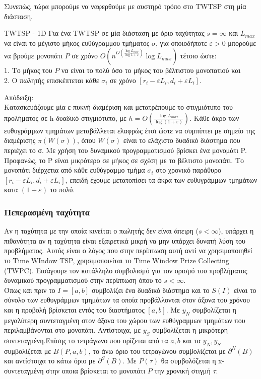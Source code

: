 \documentclass[oneside,12pt]{book}
\theoremstyle{definition}
\begin{document}
Συνεπώς, τώρα μπορούμε να ναφερθούμε με αυστηρό τρόπο στο TWTSP στη μία διάσταση. \\

\begin{mytheorem}{TWTSP - 1D}{}
	Για ένα TWTSP σε μία διάσταση με όριο ταχύτητας \(s = \infty\) και \(L_{max}\) να είναι το μέγιστο μήκος ευθύγραμμου τμήματος \(σ\), για οποιοδήποτε \(ε > 0\) μπορούμε να βρούμε μονοπάτι \(P\) σε χρόνο \(Ο(n^{O(\frac{\log L_{max}}{\log 1 + ε})} \log L_{max})\) τέτοιο ώστε: \\
	1. Το μήκος του \(P\) να είναι το πολύ όσο το μήκος του βέλτιστου μονοπατιού και \\
	2. Ο πωλητής επισκέπτεται κάθε \(σ_i\) σε χρόνο \([r_i - εL_i, d_i + εL_i]\).
\end{mytheorem}

Απόδειξη: \\
Κατασκευάζουμε μία ε-πυκνή διαμέριση και μετατρέπουμε το στιγμιότυπο του προλήματος σε h-δυαδικό στιγμιότυπο, με \(h = O(\frac{\log L_{max}}{\log (1+ε)})\). Κάθε άκρο των ευθυγράμμων τμημάτων μεταβάλλεται ελαφρώς έτσι ώστε να συμπίπτει με σημείο της διαμέρισης \(π(W(σ))\), όπου \(W(σ)\) είναι το ελάχιστο δυαδικό διάστημα που περιέχει το σ. Με χρήση του δυναμικού προγραμματισμού βρίσκει ένα μονομάτι P. Προφανώς, το P είναι μικρότερο σε μήκος σε σχέση με το βέλτιστο μονοπάτι. Το μονοπάτι διέρχετια από κάθε ευθύγραμμο τμήμα \(σ_i\) στο χρονικό παράθυρο \([r_i - εL_i, d_i + εL_i]\), επειδή έχουμε μετατοπίσει τα άκρα των ευθυγράμμων τμημάτων κατα \((1+ε)\) το πολύ.

\subsubsection{Πεπερασμένη ταχύτητα}

Αν η ταχύτητα με την οποία κινείται ο πωλητής δεν είναι άπειρη (\(s < \infty\)), υπάρχει η πιθανότητα αν η ταχύτητα είναι εξαιρετικά μικρή να μην υπάρχει δυνατή λύση του προβλήματος. Αυτός είναι ο λόγος που στην περίπτωση αυτή αντί να χρησιμοποιηθεί το Time WIndow TSP, χρησιμοποιείται το Time Window Prize Collecting (TWPC). Εισάγουμε τον κατάλληλο συμβολισμό για τον ορισμό του προβλήματος δυναμικού προγραμματισμού στην περίπτωση όπου το \(s < \infty\). \\

Όπως και πριν το \(I = [a,b]\) συμβολίζει ένα δυαδικό διάστημα και το \(S(I)\) είναι το σύνολο των ευθυγράμμων τμημάτων τα οποία προβάλλονται στον άξονα του χρόνου και η προβολή βρίσκεται εντός του διαστήματος \([a,b]\). Με \(y_N\) συμβολίζεται η μεγαλύτερη συντεταγμένη στον άξονα του χώρου των ευθύγραμμων τμημάτων που περιλαμβάνονται στο μονοπάτι. Αντίστοιχα, με \(y_S\) συμβολίζεται η μικρότερη συντεταγμένη.Επίσης το τετράγωνο που ορίζεται από τα \(a,b\) και τα \(y_N, y_S\) συμβολίζεται με \(B(P,a,b)\), το άνω όριο του τετραγώνου συμβολίζεται με \(\partial^{N}(B)\) και αντίστοιχα το κάτω όριο με \(\partial^{S}(B)\). Με \(P(τ)\) θα συμβολόζεται η x-συντεταγμένη στην οποια βρίσκεται το μονοπάτι \(P\) την χρονική στιγμή \(τ\).
\end{document}
